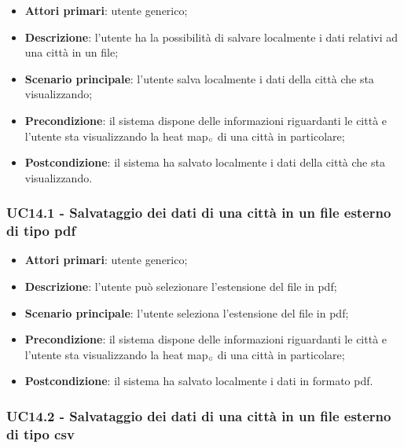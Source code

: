 \begin{itemize}
	\item \textbf{Attori primari}: utente generico;
	\item \textbf{Descrizione}: l’utente ha la possibilità di salvare localmente i dati relativi ad una città in un file;
	\item \textbf{Scenario principale}: l’utente salva localmente i dati della città che sta visualizzando;
	\item \textbf{Precondizione}: il sistema dispone delle informazioni riguardanti le città e  l’utente sta visualizzando la heat map$_{\scaleto{G}{3pt}}$ di una città in particolare;
	\item \textbf{Postcondizione}: il sistema ha salvato localmente i dati della città che sta visualizzando.
\end{itemize}

\subsubsection{UC14.1 - Salvataggio dei dati di una città in un file esterno di tipo pdf}\label{CasiDUsoCasiDUsoFacoltativiTraUnUtenteEIlFrontEndElencoCasiDUsoUC141SalvataggioDeiDatiDiUnaCittaInUnFileEsternoDiTipoPdf}

\begin{itemize}
	\item \textbf{Attori primari}: utente generico;
	\item \textbf{Descrizione}: l’utente può selezionare l’estensione del file in pdf;
	\item \textbf{Scenario principale}: l’utente seleziona l’estensione del file in pdf;
	\item \textbf{Precondizione}: il sistema dispone delle informazioni riguardanti le città e  l’utente sta visualizzando la heat map$_{\scaleto{G}{3pt}}$ di una città in particolare;
	\item \textbf{Postcondizione}: il sistema ha salvato localmente i dati in formato pdf.
\end{itemize}

\subsubsection{UC14.2 - Salvataggio dei dati di una città in un file esterno di tipo csv}\label{CasiDUsoCasiDUsoFacoltativiTraUnUtenteEIlFrontEndElencoCasiDUsoUC142SalvataggioDeiDatiDiUnaCittaInUnFileEsternoDiTipoCsv}

